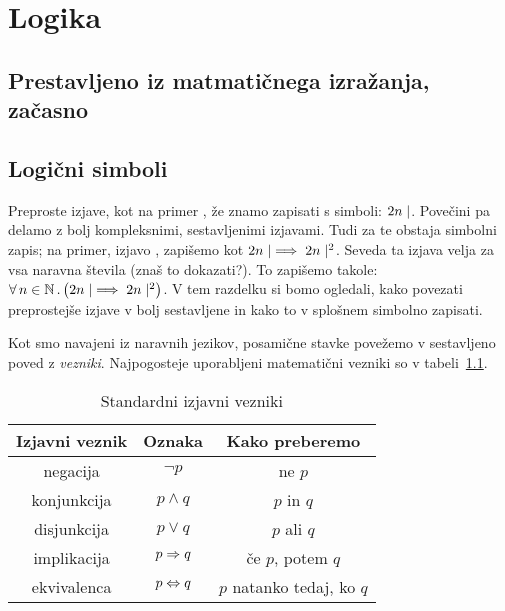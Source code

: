 \chapter{Logika}\label{poglavje:logika}

\section{Prestavljeno iz matmatičnega izražanja, začasno}
\label{sec:prest-iz-matm}


\section{Logični simboli}\label{razdelek:logicni-simboli}

Preproste izjave, kot na primer , že znamo zapisati s simboli: $2 \divides n$. Povečini pa delamo z bolj kompleksnimi, sestavljenimi izjavami. Tudi za te obstaja simbolni zapis; na primer, izjavo , zapišemo kot $2 n \mid \implies 2 n \mid ^2$. Seveda ta izjava velja za vsa naravna števila (znaš to dokazati?). To zapišemo takole: $\all{n}[\NN]{2 \divides n \implies 2 \divides n^2}$. V tem razdelku si bomo ogledali, kako povezati preprostejše izjave v bolj sestavljene in kako to v splošnem simbolno zapisati.

Kot smo navajeni iz naravnih jezikov, posamične stavke povežemo v sestavljeno poved z \emph{vezniki}. Najpogosteje uporabljeni matematični vezniki so v tabeli~\ref{tabela:standardni-izjavni-vezniki}.

\begin{table}[!ht]
\centering
\begin{tabular}{|ccc|}
\hline
\textbf{Izjavni veznik} & \textbf{Oznaka} & \textbf{Kako preberemo} \\
\hline
negacija & $\lnot{p}$ & ne $p$ \\
konjunkcija & $p \land q$ & $p$ in $q$ \\
disjunkcija & $p \lor q$ & $p$ ali $q$ \\
implikacija & $p \Rightarrow q$ & če $p$, potem $q$ \\
ekvivalenca & $p \Leftrightarrow q$ & $p$ natanko tedaj, ko $q$ \\
\hline
\end{tabular}
\caption{Standardni izjavni vezniki}\label{tabela:standardni-izjavni-vezniki}
\end{table}

